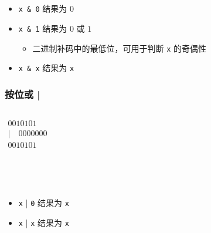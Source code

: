 \begin{frame}[fragile]
\begin{columns}
    \end{columns}

    \quad \\
    \quad \\

    \begin{itemize}
        \item<2-> \lstinline|x & 0| 结果为 $0$
        \item<4-> \lstinline|x & 1| 结果为 $0$ 或 $1$
        
        \begin{itemize}
            \item<5-> 二进制补码中的最低位，可用于判断 \lstinline|x| 的奇偶性
        \end{itemize}

        \item<7-> \lstinline|x & x| 结果为 \lstinline|x| 
    \end{itemize}

\end{frame}

\begin{frame}[fragile]
    \frametitle{按位或 |}

    \begin{columns}

        $
        \begin{array}{r}
                        0010101 \\
            | \quad     0000000 \\ \hline
                        0010101
        \end{array}
        $

        
    \end{columns}

    \quad \\
    \quad \\

    \begin{itemize}
        \item<1-> \lstinline|x| | \lstinline|0| 结果为 \lstinline|x|
        \item<2-> \lstinline|x| | \lstinline|x| 结果为 \lstinline|x|
    \end{itemize}

\end{frame}

